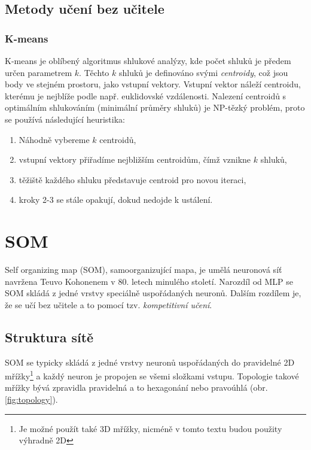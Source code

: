 \documentclass[thesis=M,czech]{FITthesis}[2012/06/26]
\begin{document}
 
 \subsection{Metody učení bez učitele}

  \subsubsection*{K-means}

K-means je oblíbený algoritmus shlukové analýzy, kde počet shluků je předem určen parametrem $k$. Těchto $k$ shluků je definováno svými \textit{centroidy}, což jsou body ve stejném prostoru, jako vstupní vektory. Vstupní vektor náleží centroidu, kterému je nejblíže podle např. euklidovské vzdálenosti. Nalezení centroidů s optimálním shlukováním (minimální průměry shluků) je NP-tězký problém\cite{k-means-nphard}, proto se  používá následující heuristika\cite{k-means-algo}:

\begin{enumerate}
\item Náhodně vybereme $k$ centroidů,
\item  vstupní vektory přiřadíme nejbližším centroidům, čímž vznikne $k$ shluků,
\item těžiště každého shluku představuje centroid pro novou iteraci,
\item kroky 2-3 se stále opakují, dokud nedojde k ustálení.
\end{enumerate}


\section{SOM}\label{sec:som_teo}
Self organizing map (SOM), samoorganizující mapa, je umělá neuronová síť navržena Teuvo Kohonenem v 80. letech minulého století. Narozdíl od MLP se SOM skládá z jedné vrstvy speciálně uspořádaných neuronů. Dalším rozdílem je, že se učí bez učitele a to pomocí tzv. \textit{kompetitivní učení}.\cite{junkie}

\subsection{Struktura sítě}


SOM se typicky skládá z jedné vrstvy neuronů uspořádaných do pravidelné 2D mřížky\footnote{Je možné použít také 3D mřížky, nicméně v tomto textu budou použity výhradně 2D} a každý neuron je propojen se všemi složkami vstupu. Topologie takové mřížky bývá zpravidla pravidelná a to hexagonání nebo pravoúhlá (obr. \ref{fig:topology}).
\end{document}

